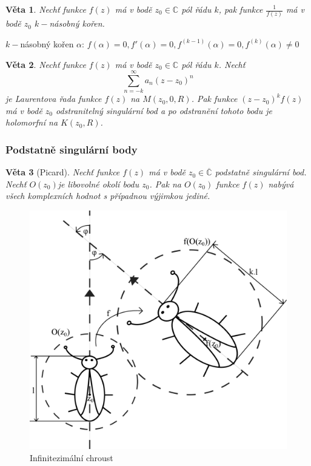 \documentclass[a4]{report}
\newtheorem{theorem}{Věta}
\theoremstyle{definition}
\begin{document}
\begin{theorem}
Nechť funkce $f(z)$ má v bodě $z_0\in\mathbb{C}$ pól řádu $k$, pak funkce $\frac{1}{f(z)}$ má v bodě $z_0$ $k-$násobný kořen.
\end{theorem}

$k-$násobný kořen $\alpha$: $f(\alpha)=0,f'(\alpha)=0,f^{(k-1)}(\alpha)=0,f^{(k)}(\alpha)\neq 0$

\begin{theorem}
Nechť funkce $f(z)$ má v bodě $z_0\in\mathbb{C}$ pól řádu $k$. Nechť $$\sum_{n=-k}^{\infty}a_n(z-z_0)^n$$ je Laurentova řada funkce $f(z)$ na $M(z_0,0,R)$. Pak funkce $(z-z_0)^kf(z)$ má v bodě $z_0$ odstranitelný singulární bod a po odstranění tohoto bodu je holomorfní na $K(z_0,R)$.
\end{theorem}

\subsubsection{Podstatně singulární body}
\begin{theorem}[Picard]
Nechť funkce $f(z)$ má v bodě $z_0\in\overline{\mathbb{C}}$ podstatně singulární bod. Nechť $O(z_0)$je libovolné okolí bodu $z_0$. Pak na $O(z_0)$ funkce $f(z)$ nabývá všech komplexních hodnot s případnou výjimkou jediné.
\end{theorem}

\begin{figure}[H]
\includegraphics[scale=0.25]{Chroust.png}
\caption{Infinitezimální chroust}
\end{figure}
\end{document}

